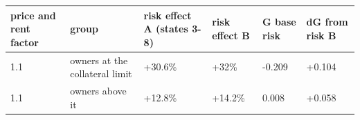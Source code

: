 \begingroup\small
\setlength{\tabcolsep}{3pt}
\renewcommand{\arraystretch}{1.04}
\begin{tabularx}{\linewidth}{XXXXXX}
\toprule
price and rent factor & group & risk effect A (states 3-8) & risk effect B & G base risk & dG from risk B \\
\midrule
1.1 & owners at the collateral limit & +30.6\% & +32\% & -0.209 & +0.104 \\
1.1 & owners above it & +12.8\% & +14.2\% & 0.008 & +0.058 \\
\bottomrule
\end{tabularx}
\endgroup
